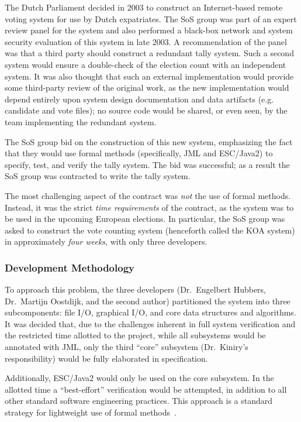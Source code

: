 \documentclass{llncs}
\begin{document}
The Dutch Parliament decided in 2003 to construct an Internet-based
remote voting system for use by Dutch expatriates.  The SoS group was
part of an expert review panel for the system and also performed a
black-box network and system security evaluation of this system in
late 2003.  A recommendation of the panel was that a third party
should construct a redundant tally system.  Such a second system would
ensure a double-check of the election count with an independent
system.  It was also thought that such an external implementation
would provide some third-party review of the original work, as the new
implementation would depend entirely upon system design documentation
and data artifacts (e.g. candidate and vote files); no source code
would be shared, or even seen, by the team implementing the redundant
system.

The SoS group bid on the construction of this new system, emphasizing
the fact that they would use formal methods (specifically, JML and
ESC/Java2) to specify, test, and verify the tally system.  The bid was
successful; as a result the SoS group was contracted to write the
tally system.

The most challenging aspect of the contract was \emph{not} the use of
formal methods.  Instead, it was the strict \emph{time requirements}
of the contract, as the system was to be used in the upcoming European
elections.  In particular, the SoS group was asked to construct the
vote counting system (henceforth called the \textsc{KOA} system) in
approximately \emph{four weeks}, with only three developers.

\subsubsection{Development Methodology}

To approach this problem, the three developers (Dr.~Engelbert Hubbers,
Dr.~Martijn Oostdijk, and the second author) partitioned the system
into three subcomponents: file I/O, graphical I/O, and core
data structures and algorithms.  It was decided that, due to the
challenges inherent in full system verification and the restricted
time allotted to the project, while all subsystems would be annotated
with JML, only the third ``core'' subsystem (Dr.~Kiniry's
responsibility) would be fully elaborated in specification.

Additionally, ESC/Java2 would only be used on the core subsystem.  In
the allotted time a ``best-effort'' verification would be attempted, in
addition to all other standard software engineering practices.  This
approach is a standard strategy for lightweight use of formal
methods~\cite{ClarkeWing96}.
\end{document}
